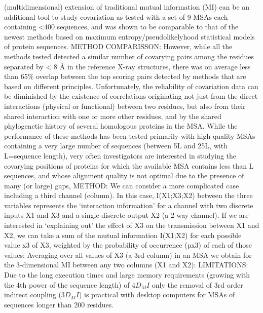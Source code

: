 (multidimensional) extension of traditional mutual information (MI) can be an additional tool to study covariation \cite{clark2014multidimensional}
as tested with a set of 9 MSAs each containing <400 sequences, and was shown to be comparable to that of the newest methods based on maximum entropy/pseudolikelyhood statistical models of protein sequences.  \cite{clark2014multidimensional}
METHOD COMPARISSON: However, while all the methods tested detected a similar number of covarying pairs among the residues separated by < 8 Å in the reference X-ray structures, there was on average less than 65\% overlap between the top scoring pairs detected by methods that are based on different principles. \cite{clark2014multidimensional}
Unfortunately, the reliability of covariation data can be diminished by the existence of correlations originating not just from the direct interactions (physical or functional) between two residues, but also from their shared interaction with one or more other residues, and by the shared phylogenetic history of several homologous proteins in the MSA.  \cite{clark2014multidimensional}
While the performance of these methods has been tested primarily with high quality MSAs containing a very large number of sequences (between 5L and 25L, with L=sequence length), very often investigators are interested in studying the covarying positions of proteins for which the available MSA contains less than L sequences, and whose alignment quality is not optimal due to the presence of many (or large) gaps, \cite{clark2014multidimensional}
METHOD:  \cite{clark2014multidimensional}
	We can consider a more complicated case including a third channel (column). In this case, I(X1;X3;X2) between the three variables represents the `interaction information' for a channel with two discrete inputs X1 and X3 and a single discrete output X2 (a 2-way channel).  \cite{clark2014multidimensional}
	If we are interested in `explaining out' the effect of X3 on the transmission between X1 and X2, we can take a sum of the mutual information I(X1;X2) for each possible value x3 of X3, weighted by the probability of occurrence (px3) of each of those values: \cite{clark2014multidimensional}
	Averaging over all values of X3 (a 3rd column) in an MSA we obtain for the 3-dimensional MI between any two columns (X1 and X2): \cite{clark2014multidimensional}
LIMITATIONS: Due to the long execution times and large memory requirements (growing with the 4th power of the sequence length) of $4D_MI$ only the removal of 3rd order indirect coupling ($3D_MI$) is practical with desktop computers for MSAs of sequences longer than 200 residues. \cite{clark2014multidimensional}
